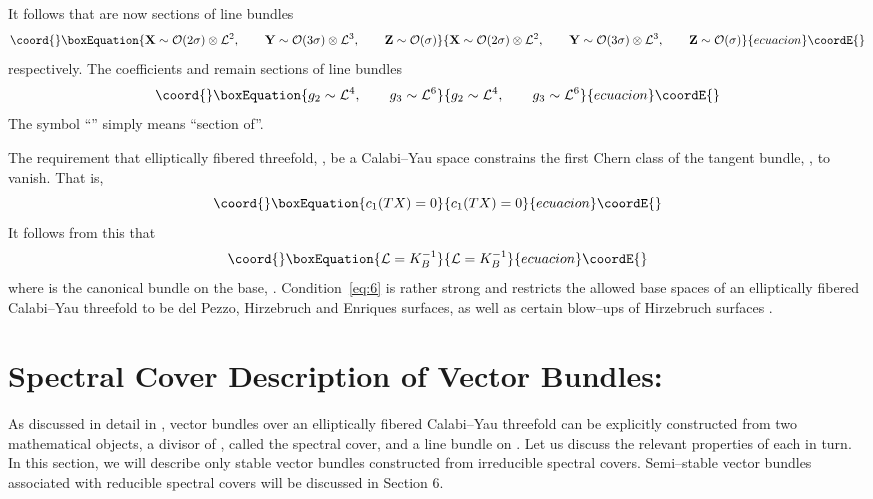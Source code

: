 \documentclass[a4paper,12pt]{article}
\numberwithin{equation}{section}
\providecommand{\bX}{{\mathbf X}}
\providecommand{\bY}{{\mathbf Y}}
\providecommand{\bZ}{{\mathbf Z}}
\def\cC{{\mathcal C}}
\def\cL{{\mathcal L}}
\def\cN{{\mathcal N}}
\def\cO{{\mathcal O}}
\theoremstyle{plain}
\begin{document}
It follows that \myHighlight{$\bX,\bY,\bZ$}\coordHE{} are now sections of line bundles
\begin{equation}\coord{}\boxEquation{
\bX \sim \cO(2\sigma)\otimes\cL^2 , \qquad
\bY \sim \cO(3\sigma)\otimes \cL^3 , \qquad
\bZ \sim \cO(\sigma)
\label{eq:3}
}{
\bX \sim \cO(2\sigma)\otimes\cL^2 , \qquad
\bY \sim \cO(3\sigma)\otimes \cL^3 , \qquad
\bZ \sim \cO(\sigma)
}{ecuacion}\coordE{}\end{equation}
respectively. The coefficients \coordHE{} and \coordHE{} remain 
sections of line bundles
\begin{equation}\coord{}\boxEquation{
g_2 \sim \cL^4, \qquad 
g_3 \sim \cL^6
\label{eq:4}
}{
g_2 \sim \cL^4, \qquad 
g_3 \sim \cL^6
}{ecuacion}\coordE{}\end{equation}
The symbol ``\myHighlight{$\sim$}\coordHE{}'' simply means ``section of''.


The requirement that elliptically fibered threefold, \coordHE{}, be a
Calabi--Yau space 
constrains the first Chern class of the tangent bundle, \coordHE{}, to
vanish. That is, 
\begin{equation}\coord{}\boxEquation{
c_1(TX)=0
\label{eq:5}
}{
c_1(TX)=0
}{ecuacion}\coordE{}\end{equation}
It follows from this that 
\begin{equation}\coord{}\boxEquation{
\cL=K_B^{-1}
\label{eq:6}
}{
\cL=K_B^{-1}
}{ecuacion}\coordE{}\end{equation}
where \coordHE{} is the canonical bundle on the base, \coordHE{}. 
Condition~\eqref{eq:6} is
rather strong and restricts the allowed base spaces of an elliptically
fibered Calabi--Yau threefold to be del Pezzo, Hirzebruch and Enriques
surfaces, as well as certain blow--ups of Hirzebruch 
surfaces \cite{Grassi, MoVa} .


\section{Spectral Cover Description of \coordHE{} Vector Bundles:}


As discussed in detail in \cite{FMW, don2},  \coordHE{} vector 
bundles over an elliptically
fibered Calabi--Yau threefold can be explicitly constructed from two
mathematical objects, a divisor \myHighlight{$\cC$}\coordHE{} of \coordHE{}, called the spectral cover, and a
line bundle \myHighlight{$\cN$}\coordHE{} on \myHighlight{$\cC$}\coordHE{}. Let us discuss the relevant properties of each in
turn. In this section, we will describe only stable \coordHE{} vector bundles
constructed from irreducible spectral covers. Semi--stable vector bundles
associated with reducible spectral covers will be discussed in Section 6.
\end{document}
